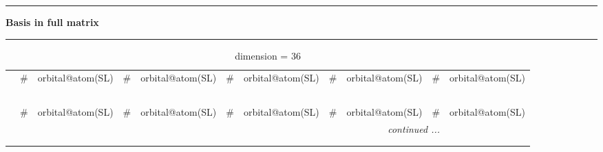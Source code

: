\documentclass[fleqn,10pt,landscape]{jsarticle}
\begin{document}
\vspace{5mm}
\noindent \rule[0.5mm]{5mm}{0.5mm}\hspace{3mm}\textbf{Basis in full matrix}\hspace{3mm}\leaders\hrule height 0.5mm\hfill\kern0pt
\vspace{3mm}

\renewcommand{\arraystretch}{1.6}
\begin{longtable}[l]{c|cl|cl|cl|cl|cl}
\captionsetup{justification=raggedright, singlelinecheck=off}
\caption{dimension = 36}
 \\
 \hline \hline
 & \# & orbital@atom(SL) & \# & orbital@atom(SL) & \# & orbital@atom(SL) & \# & orbital@atom(SL) & \# & orbital@atom(SL) \\ \hline \endfirsthead

\multicolumn{10}{l}{\tablename\ \thetable{}} \\
 \hline \hline
 & \# & orbital@atom(SL) & \# & orbital@atom(SL) & \# & orbital@atom(SL) & \# & orbital@atom(SL) & \# & orbital@atom(SL) \\ \hline \endhead

 \hline \hline
\multicolumn{10}{r}{\footnotesize\it continued ...} \\ \endfoot

 \hline \hline
\multicolumn{10}{r}{} \\ \endlastfoot


\end{longtable}
\end{document}

